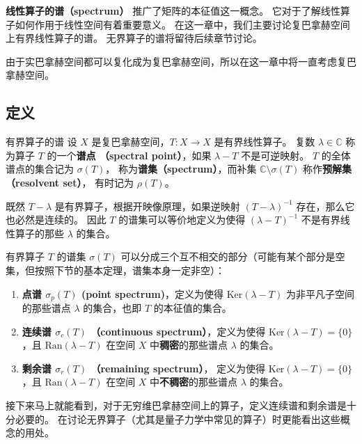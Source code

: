 
\textbf{线性算子的谱（spectrum）} 推广了矩阵的本征值这一概念。 它对于了解线性算子如何作用于线性空间有着重要意义。 在这一章中，我们主要讨论复巴拿赫空间上有界线性算子的谱。 无界算子的谱将留待后续章节讨论。

由于实巴拿赫空间都可以复化成为复巴拿赫空间，所以在这一章中将一直考虑复巴拿赫空间。

\subsection{定义}
\begin{definition}{有界算子的谱}
设 $X$ 是复巴拿赫空间，$T:X\to X$ 是有界线性算子。 复数 $\lambda\in\mathbb{C}$ 称为算子 $T$ 的一个\textbf{谱点 （spectral point）}，如果 $\lambda-T$ 不是可逆映射。 $T$ 的全体谱点的集合记为 $\sigma(T)$， 称为\textbf{谱集（spectrum）}，而补集 $\mathbb{C}\setminus\sigma(T)$ 称作\textbf{预解集（resolvent set）}， 有时记为 $\rho(T)$。
\end{definition}

既然 $T-\lambda$ 是有界算子，根据开映像原理，如果逆映射 $(T-\lambda)^{-1}$ 存在，那么它也必然是连续的。 因此 $T$ 的谱集可以等价地定义为使得 $(\lambda-T)^{-1}$ 不是有界线性算子的那些 $\lambda$ 的集合。

有界算子 $T$ 的谱集 $\sigma(T)$ 可以分成三个互不相交的部分（可能有某个部分是空集，但按照下节的基本定理，谱集本身一定非空）：

\begin{enumerate}
\item \textbf{点谱 $\sigma_p(T)$ (point spectrum)}，定义为使得 $\text{Ker}(\lambda-T)$ 为非平凡子空间的那些谱点 $\lambda$ 的集合，也即 $T$ 的本征值的集合。

\item \textbf{连续谱 $\sigma_c(T)$ （continuous spectrum）}，定义为使得 $\text{Ker}(\lambda-T)=\{0\}$，且 $\text{Ran}(\lambda-T)$ 在空间 $X$ 中\textbf{稠密}的那些谱点 $\lambda$ 的集合。

\item \textbf{剩余谱 $\sigma_r(T)$ （remaining spectrum）}， 定义为使得 $\text{Ker}(\lambda-T)=\{0\}$，且 $\text{Ran}(\lambda-T)$ 在空间 $X$ 中\textbf{不稠密}的那些谱点 $\lambda$ 的集合。
\end{enumerate}

接下来马上就能看到，对于无穷维巴拿赫空间上的算子，定义连续谱和剩余谱是十分必要的。 在讨论无界算子（尤其是量子力学中常见的算子）时更能看出这些概念的用处。

